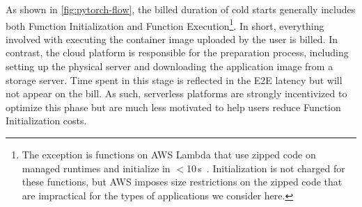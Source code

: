 \documentclass[sigplan,screen]{acmart}
\begin{document}
As shown in \cref{fig:pytorch-flow}, the billed duration of cold starts generally includes both Function Initialization and Function Execution\footnote{The exception is functions on AWS Lambda that use zipped code on managed runtimes and initialize in $<$10\,s~\cite{lambdafree-blog}.
Initialization is not charged for these functions, but AWS imposes size restrictions on the zipped code that are impractical for the types of applications we consider here.}.
In short, everything involved with executing the container image uploaded by the user is billed. 
In contrast, the cloud platform is responsible for the preparation process, including setting up the physical server and downloading the application image from a storage server.
Time spent in this stage is reflected in the E2E latency but will not appear on the bill.
As such, serverless platforms are strongly incentivized to optimize this phase but are much less motivated to help users reduce Function Initialization costs.
 
\end{document}
